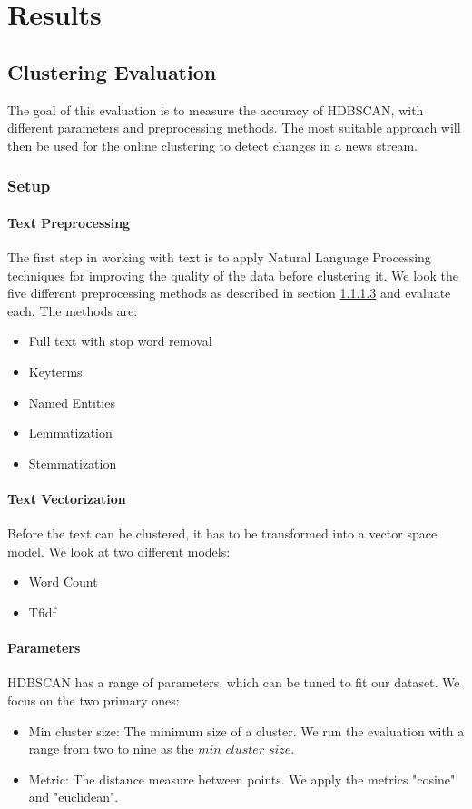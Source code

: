 \section{Results}

\subsection{Clustering Evaluation}

The goal of this evaluation is to measure the accuracy of HDBSCAN, with different parameters and preprocessing methods. The most suitable approach will then be used for the online clustering to detect changes in a news stream.

\subsubsection{Setup}

\paragraph{Text Preprocessing}

 The first step in working with text is to apply Natural Language Processing techniques for improving the quality of the data before clustering it. We look the five different preprocessing methods  as described in section \ref{} and evaluate each. The methods are:
 \begin{itemize}
     \item Full text with stop word removal
     \item Keyterms
     \item Named Entities
     \item Lemmatization
     \item Stemmatization
 \end{itemize} 

\paragraph{Text Vectorization} Before the text can be clustered, it has to be transformed into a vector space model. We look at two different models:
\begin{itemize}
    \item Word Count
    \item Tfidf
\end{itemize}

\paragraph{Parameters} HDBSCAN has a range of parameters, which can be tuned to fit our dataset. We focus on the two primary ones:
\begin{itemize}
    \item Min cluster size: The minimum size of a cluster. We run the evaluation with a range from two to nine as the $min\_cluster\_size$. 
    \item Metric: The distance measure between points. We apply the metrics "cosine" and "euclidean". 
    
\end{itemize}

